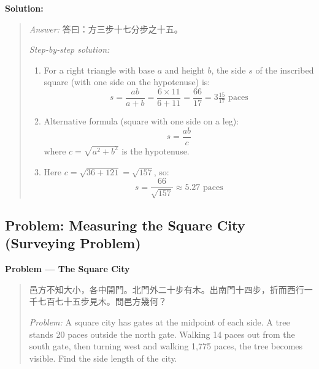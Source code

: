 \documentclass[11pt,a4paper]{article}
\newcommand{\zh}[1]{{#1}}
\newenvironment{chproblem}[1][]{%
  \par\medskip\noindent\textbf{\textcolor{sectioncolor}{#1}}\par\nopagebreak
  \begin{quote}\small
}{%
  \end{quote}\medskip
}
\newenvironment{chsolution}{%
  \par\medskip\noindent\textbf{\textcolor{notecolor}{Solution:}}\par\nopagebreak
  \begin{quote}\small
}{%
  \end{quote}\medskip
}
\newenvironment{stepbystep}{%
  \par\smallskip\noindent\textit{Step-by-step solution:}\par\nopagebreak
  \begin{enumerate}[leftmargin=2em,label=\textbf{Step \arabic*:},ref=\arabic*]
}{%
  \end{enumerate}\medskip
}
\begin{document}
\begin{chsolution}
\textit{Answer:} \zh{答曰：方三步十七分步之十五。}

\begin{stepbystep}
\item For a right triangle with base $a$ and height $b$, the side $s$ of the
inscribed square (with one side on the hypotenuse) is:
\[
s = \frac{ab}{a + b} = \frac{6 \times 11}{6 + 11} = \frac{66}{17} = 3\tfrac{15}{17} \text{ paces}
\]

\item Alternative formula (square with one side on a leg):
\[
s = \frac{ab}{c}
\]
where $c = \sqrt{a^2 + b^2}$ is the hypotenuse.

\item Here $c = \sqrt{36 + 121} = \sqrt{157}$, so:
\[
s = \frac{66}{\sqrt{157}} \approx 5.27 \text{ paces}
\]
\end{stepbystep}
\end{chsolution}

\subsection{Problem: Measuring the Square City (Surveying Problem)}

\begin{chproblem}[Problem --- The Square City]
\zh{邑方不知大小，各中開門。北門外二十步有木。出南門十四步，折而西行一千七百七十五步見木。問邑方幾何？}

\medskip
\textit{Problem:} A square city has gates at the midpoint of each side. A
tree stands 20 paces outside the north gate. Walking 14 paces out from the
south gate, then turning west and walking 1,775 paces, the tree becomes
visible. Find the side length of the city.
\end{chproblem}
\end{document}
